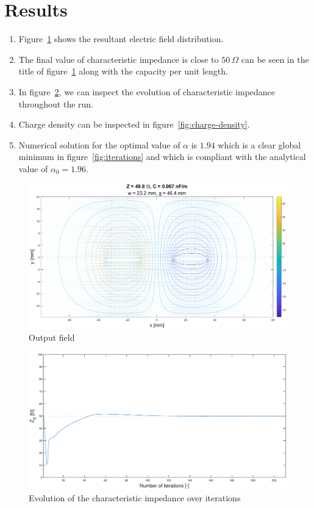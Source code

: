 \documentclass[11pt,a4paper]{article}
\begin{document}
\section{Results}
\begin{enumerate}[label=(\alph*)]
    \item Figure~\ref{fig:output-field} shows the resultant electric field distribution.
    \item The final value of characteristic impedance is close to $50\ \Omega$ can be seen in the title of figure~\ref{fig:output-field} along with the capacity per unit length.
    \item In figure~\ref{fig:impedance}, we can inspect the evolution of characteristic impedance throughout the run.
    \item Charge density can be inspected in figure~\ref{fig:charge-density}.
    \item Numerical solution for the optimal value of $\alpha$ is $1.94$ which is a clear global minimum in figure~\ref{fig:iterations} and which is compliant with the analytical value of $\alpha_0 = 1.96$.
\end{enumerate}
\begin{figure}[!ht]
    \centering
    \includegraphics[width=\textwidth]{src/electric_field.eps}
    \caption{Output field}
    \label{fig:output-field}
\end{figure}
\begin{figure}[!ht]
    \centering
    \includegraphics[width=\textwidth]{src/impedance.eps}
    \caption{Evolution of the characteristic impedance over iterations}
    \label{fig:impedance}
\end{figure}
\end{document}
